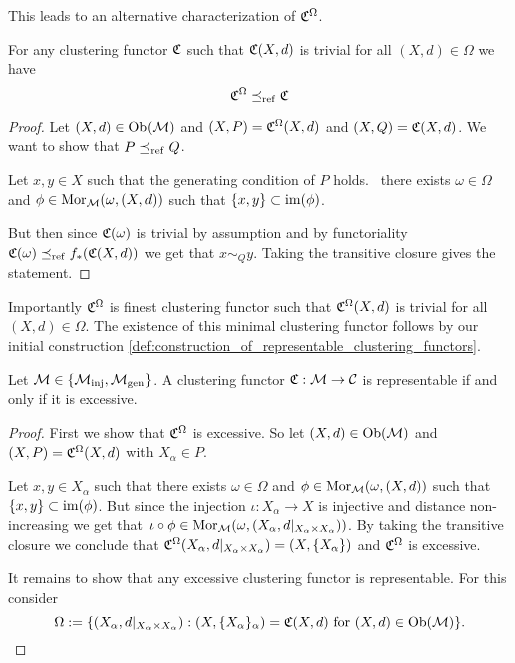 This leads to an alternative characterization of $\mathfrak{C}^\Omega$.

\begin{proposition}{}{}
For any clustering functor $\mathfrak{C}$ such that $\mathfrak{C}(X,d)$ is trivial for all $(X,d) \in \Omega$ we have
$$
\mathfrak{C}^\Omega \preceq_\mathrm{ref} \mathfrak{C}
$$
\end{proposition}

\begin{proof}
Let $(X,d) \in \mathrm {Ob}(\mathcal{M})$ and $(X,P) = \mathfrak{C}^\Omega(X,d)$ and $(X,Q) = \mathfrak{C}(X,d)$. We want to show that $P \preceq_\mathrm{ref} Q$.

Let $x,y \in X$ such that the generating condition of $P$ holds. \Ie\ there exists $\omega \in \Omega$ and $\phi \in \mathrm {Mor}_{\mathcal{M}}(\omega, (X,d))$ such that $\{x,y\} \subset \operatorname*{im}(\phi)$.

But then since $\mathfrak{C}(\omega)$ is trivial by assumption and by functoriality $\mathfrak{C}(\omega) \preceq_\mathrm{ref} f_*(\mathfrak{C}(X,d))$ we get that $x \sim_Q y$. Taking the transitive closure gives the statement.


\end{proof}

Importantly $\mathfrak{C}^\Omega$ is finest clustering functor such that $\mathfrak{C}^\Omega(X,d)$ is trivial for all $(X,d) \in \Omega$. The existence of this minimal clustering functor follows by our initial construction \ref{def:construction_of_representable_clustering_functors}.

\begin{theorem}{\cite{Carlsson2010}}{}
Let $\mathcal{M} \in \{{\mathcal{M}_\mathrm{inj}}, {\mathcal{M}_\mathrm{gen}}\}$. A clustering functor $\mathfrak{C}: \mathcal{M} \to \mathcal{C}$ is representable if and only if it is excessive.
\end{theorem}

\begin{proof}
First we show that $\mathfrak{C}^\Omega$ is excessive. So let $(X,d) \in \mathrm {Ob}(\mathcal{M})$ and $(X,P) = \mathfrak{C}^\Omega(X,d)$ with $X_\alpha \in P$.

Let $x,y \in X_\alpha$ such that there exists $\omega \in \Omega$ and $\phi \in \mathrm {Mor}_{\mathcal{M}}(\omega, (X,d))$ such that $\{x,y\} \subset \operatorname*{im}(\phi)$. But since the injection $\iota: X_\alpha \to X$ is injective and distance non-increasing we get that $\iota \circ \phi \in \mathrm {Mor}_{\mathcal{M}}(\omega, (X_\alpha, d|_{X_\alpha \times X_\alpha}))$. By taking the transitive closure we conclude that $\mathfrak{C}^\Omega(X_\alpha, d|_{X_\alpha \times X_\alpha}) = (X, \{X_\alpha\})$ and $\mathfrak{C}^\Omega$ is excessive.

It remains to show that any excessive clustering functor is representable. For this consider
$$
\Omega := \{(X_\alpha, d|_{X_\alpha \times X_\alpha}): (X, \{X_\alpha\}_\alpha) = \mathfrak{C}(X,d) \text{ for } (X,d) \in \mathrm {Ob}(\mathcal{M})\}.
$$
\end{proof}

